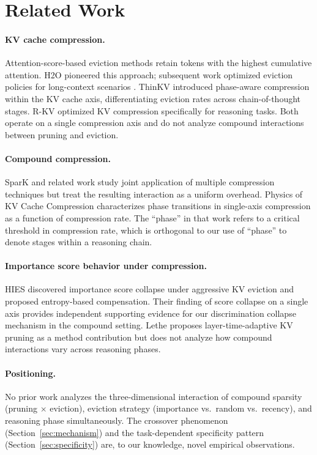 \documentclass[11pt,a4paper]{article}
\begin{document}
\section{Related Work}

\paragraph{KV cache compression.}
Attention-score-based eviction methods retain tokens with the highest cumulative attention. H2O \citep{zhang2024h2o} pioneered this approach; subsequent work optimized eviction policies for long-context scenarios \citep{xiao2024efficient}. ThinKV \citep{thinKV2025} introduced phase-aware compression within the KV cache axis, differentiating eviction rates across chain-of-thought stages. R-KV \citep{rkv2025} optimized KV compression specifically for reasoning tasks. Both operate on a single compression axis and do not analyze compound interactions between pruning and eviction.

\paragraph{Compound compression.}
SparK and related work study joint application of multiple compression techniques but treat the resulting interaction as a uniform overhead. Physics of KV Cache Compression \citep{physics_kv2026} characterizes phase transitions in single-axis compression as a function of compression rate. The ``phase'' in that work refers to a critical threshold in compression rate, which is orthogonal to our use of ``phase'' to denote stages within a reasoning chain.

\paragraph{Importance score behavior under compression.}
HIES \citep{hies2025} discovered importance score collapse under aggressive KV eviction and proposed entropy-based compensation. Their finding of score collapse on a single axis provides independent supporting evidence for our discrimination collapse mechanism in the compound setting. Lethe \citep{lethe2026} proposes layer-time-adaptive KV pruning as a method contribution but does not analyze how compound interactions vary across reasoning phases.

\paragraph{Positioning.}
No prior work analyzes the three-dimensional interaction of compound sparsity (pruning $\times$ eviction), eviction strategy (importance vs.\ random vs.\ recency), and reasoning phase simultaneously. The crossover phenomenon (Section~\ref{sec:mechanism}) and the task-dependent specificity pattern (Section~\ref{sec:specificity}) are, to our knowledge, novel empirical observations.
\end{document}
